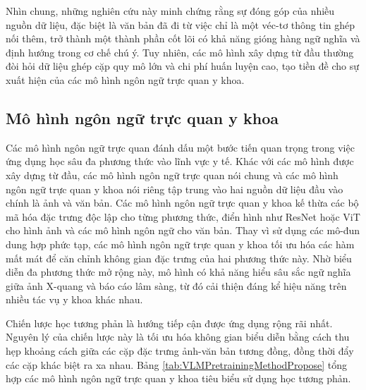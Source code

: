 Nhìn chung, những nghiên cứu này minh chứng rằng sự đóng góp của nhiều nguồn dữ liệu, đặc biệt là văn bản đã đi từ việc chỉ là một véc-tơ thông tin ghép nối thêm, trở thành một thành phần cốt lõi có khả năng gióng hàng ngữ nghĩa và định hướng trong cơ chế chú ý. Tuy nhiên, các mô hình xây dựng từ đầu thường đòi hỏi dữ liệu ghép cặp quy mô lớn và chi phí huấn luyện cao, tạo tiền đề cho sự xuất hiện của các mô hình ngôn ngữ trực quan y khoa.

\subsection{Mô hình ngôn ngữ trực quan y khoa}

Các mô hình ngôn ngữ trực quan đánh dấu một bước tiến quan trọng trong việc ứng dụng học sâu đa phương thức vào lĩnh vực y tế. Khác với các mô hình được xây dựng từ đầu, các mô hình ngôn ngữ trực quan nói chung và các mô hình ngôn ngữ trực quan y khoa nói riêng tập trung vào hai nguồn dữ liệu đầu vào chính là ảnh và văn bản. Các mô hình ngôn ngữ trực quan y khoa kế thừa các bộ mã hóa đặc trưng độc lập cho từng phương thức, điển hình như ResNet \cite{ResNet} hoặc ViT \cite{Dosovitskiy2021ViT} cho hình ảnh và các mô hình ngôn ngữ cho văn bản. Thay vì sử dụng các mô-đun dung hợp phức tạp, các mô hình ngôn ngữ trực quan y khoa tối ưu hóa các hàm mất mát để căn chỉnh không gian đặc trưng của hai phương thức này. Nhờ biểu diễn đa phương thức mở rộng này, mô hình có khả năng hiểu sâu sắc ngữ nghĩa giữa ảnh X-quang và báo cáo lâm sàng, từ đó cải thiện đáng kể hiệu năng trên nhiều tác vụ y khoa khác nhau.

Chiến lược học tương phản là hướng tiếp cận được ứng dụng rộng rãi nhất. Nguyên lý của chiến lược này là tối ưu hóa không gian biểu diễn bằng cách thu hẹp khoảng cách giữa các cặp đặc trưng ảnh-văn bản tương đồng, đồng thời đẩy các cặp khác biệt ra xa nhau. Bảng \ref{tab:VLMPretrainingMethodPropose} tổng hợp các mô hình ngôn ngữ trực quan y khoa tiêu biểu sử dụng học tương phản.

